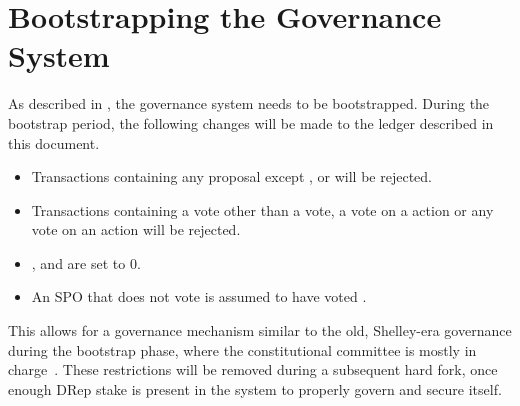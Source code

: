 \section{Bootstrapping the Governance System}
\label{sec:conway-bootstrap-gov}

As described in , the governance system needs to be
bootstrapped. During the bootstrap period, the following changes will
be made to the ledger described in this document.

\begin{itemize}
\item Transactions containing any proposal except \TriggerHF{},
      \ChangePParams{} or \Info{} will be rejected.
\item Transactions containing a vote other than a \CC{} vote,
      a \SPO{} vote on a \TriggerHF{} action or any vote on an \Info{}
      action will be rejected.
\item \Qfour{}, \Pfive{} and \Qfivee{} are set to $0$.
\item An SPO that does not vote is assumed to have voted \abstain{}.
\end{itemize}

This allows for a governance mechanism similar to the old, Shelley-era
governance during the bootstrap phase, where the constitutional
committee is mostly in charge~\parencite{shelley-delegation-design}.
These restrictions will be removed during a subsequent hard fork,
once enough DRep stake is present in the system to properly govern
and secure itself.
